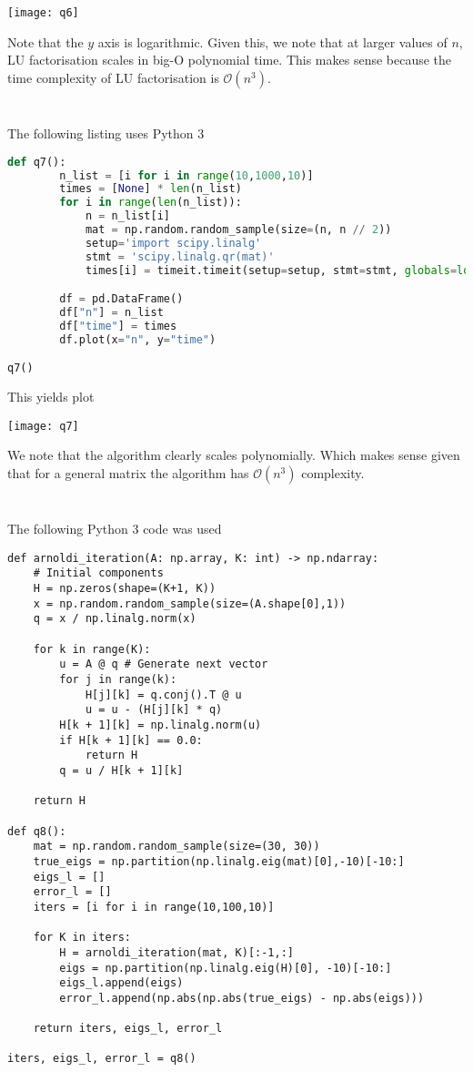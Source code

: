 \documentclass{article}
\renewcommand{\O}[1]{\mathcal{O}(#1)}
\begin{document}
\texttt{[image: q6]}

Note that the $y$ axis is logarithmic. Given this, we note that at larger
values of $n$, LU factorisation scales in big-O polynomial time. This makes
sense because the time complexity of LU factorisation is $\O{n^3}$.

\section{} %
The following listing uses Python 3

\begin{lstlisting}[language=Python]
    def q7():
        n_list = [i for i in range(10,1000,10)]
        times = [None] * len(n_list)
        for i in range(len(n_list)):
            n = n_list[i]
            mat = np.random.random_sample(size=(n, n // 2))
            setup='import scipy.linalg'
            stmt = 'scipy.linalg.qr(mat)'
            times[i] = timeit.timeit(setup=setup, stmt=stmt, globals=locals(), number=10)

        df = pd.DataFrame()
        df["n"] = n_list
        df["time"] = times
        df.plot(x="n", y="time")

q7()
\end{lstlisting}
This yields plot

\texttt{[image: q7]}

We note that the algorithm clearly scales polynomially. Which makes sense given
that for a general matrix the algorithm has $\O{n^3}$ complexity.


\section{} %
The following Python 3 code was used

\begin{lstlisting}
def arnoldi_iteration(A: np.array, K: int) -> np.ndarray:
    # Initial components
    H = np.zeros(shape=(K+1, K))
    x = np.random.random_sample(size=(A.shape[0],1))
    q = x / np.linalg.norm(x)

    for k in range(K):
        u = A @ q # Generate next vector
        for j in range(k):
            H[j][k] = q.conj().T @ u
            u = u - (H[j][k] * q)
        H[k + 1][k] = np.linalg.norm(u)
        if H[k + 1][k] == 0.0:
            return H
        q = u / H[k + 1][k]

    return H

def q8():
    mat = np.random.random_sample(size=(30, 30))
    true_eigs = np.partition(np.linalg.eig(mat)[0],-10)[-10:]
    eigs_l = []
    error_l = []
    iters = [i for i in range(10,100,10)]

    for K in iters:
        H = arnoldi_iteration(mat, K)[:-1,:]
        eigs = np.partition(np.linalg.eig(H)[0], -10)[-10:]
        eigs_l.append(eigs)
        error_l.append(np.abs(np.abs(true_eigs) - np.abs(eigs)))
    
    return iters, eigs_l, error_l

iters, eigs_l, error_l = q8()
\end{lstlisting}
\end{document}
